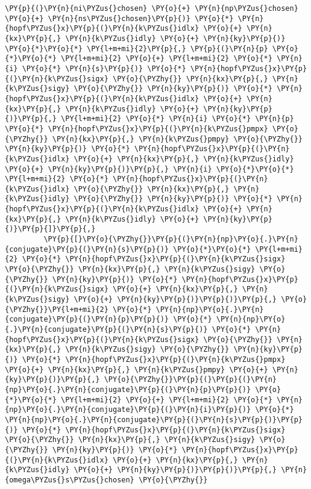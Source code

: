 \begin{Verbatim}[commandchars=\\\{\}]
          \PY{p}{(}\PY{n}{ni\PYZus{}chosen} \PY{o}{+} \PY{n}{np\PYZus{}chosen} \PY{o}{+} \PY{n}{ns\PYZus{}chosen}\PY{p}{)} \PY{o}{*} \PY{n}{hopf\PYZus{}x}\PY{p}{(}\PY{n}{k\PYZus{}idlx} \PY{o}{+} \PY{n}{kx}\PY{p}{,} \PY{n}{k\PYZus{}idly} \PY{o}{+} \PY{n}{ky}\PY{p}{)} \PY{o}{*}\PY{o}{*} \PY{l+m+mi}{2}\PY{p}{,} \PY{p}{(}\PY{n}{p} \PY{o}{*}\PY{o}{*} \PY{l+m+mi}{2} \PY{o}{+} \PY{l+m+mi}{2} \PY{o}{*} \PY{n}{i} \PY{o}{*} \PY{n}{s}\PY{p}{)} \PY{o}{*} \PY{n}{hopf\PYZus{}x}\PY{p}{(}\PY{n}{k\PYZus{}sigx} \PY{o}{\PYZhy{}} \PY{n}{kx}\PY{p}{,} \PY{n}{k\PYZus{}sigy} \PY{o}{\PYZhy{}} \PY{n}{ky}\PY{p}{)} \PY{o}{*} \PY{n}{hopf\PYZus{}x}\PY{p}{(}\PY{n}{k\PYZus{}idlx} \PY{o}{+} \PY{n}{kx}\PY{p}{,} \PY{n}{k\PYZus{}idly} \PY{o}{+} \PY{n}{ky}\PY{p}{)}\PY{p}{,} \PY{l+m+mi}{2} \PY{o}{*} \PY{n}{i} \PY{o}{*} \PY{n}{p} \PY{o}{*} \PY{n}{hopf\PYZus{}x}\PY{p}{(}\PY{n}{k\PYZus{}pmpx} \PY{o}{\PYZhy{}} \PY{n}{kx}\PY{p}{,} \PY{n}{k\PYZus{}pmpy} \PY{o}{\PYZhy{}} \PY{n}{ky}\PY{p}{)} \PY{o}{*} \PY{n}{hopf\PYZus{}x}\PY{p}{(}\PY{n}{k\PYZus{}idlx} \PY{o}{+} \PY{n}{kx}\PY{p}{,} \PY{n}{k\PYZus{}idly} \PY{o}{+} \PY{n}{ky}\PY{p}{)}\PY{p}{,} \PY{n}{i} \PY{o}{*}\PY{o}{*} \PY{l+m+mi}{2} \PY{o}{*} \PY{n}{hopf\PYZus{}x}\PY{p}{(}\PY{n}{k\PYZus{}idlx} \PY{o}{\PYZhy{}} \PY{n}{kx}\PY{p}{,} \PY{n}{k\PYZus{}idly} \PY{o}{\PYZhy{}} \PY{n}{ky}\PY{p}{)} \PY{o}{*} \PY{n}{hopf\PYZus{}x}\PY{p}{(}\PY{n}{k\PYZus{}idlx} \PY{o}{+} \PY{n}{kx}\PY{p}{,} \PY{n}{k\PYZus{}idly} \PY{o}{+} \PY{n}{ky}\PY{p}{)}\PY{p}{]}\PY{p}{,}
         \PY{p}{[}\PY{o}{\PYZhy{}}\PY{p}{(}\PY{n}{np}\PY{o}{.}\PY{n}{conjugate}\PY{p}{(}\PY{n}{s}\PY{p}{)} \PY{o}{*}\PY{o}{*} \PY{l+m+mi}{2} \PY{o}{*} \PY{n}{hopf\PYZus{}x}\PY{p}{(}\PY{n}{k\PYZus{}sigx} \PY{o}{\PYZhy{}} \PY{n}{kx}\PY{p}{,} \PY{n}{k\PYZus{}sigy} \PY{o}{\PYZhy{}} \PY{n}{ky}\PY{p}{)} \PY{o}{*} \PY{n}{hopf\PYZus{}x}\PY{p}{(}\PY{n}{k\PYZus{}sigx} \PY{o}{+} \PY{n}{kx}\PY{p}{,} \PY{n}{k\PYZus{}sigy} \PY{o}{+} \PY{n}{ky}\PY{p}{)}\PY{p}{)}\PY{p}{,} \PY{o}{\PYZhy{}}\PY{l+m+mi}{2} \PY{o}{*} \PY{n}{np}\PY{o}{.}\PY{n}{conjugate}\PY{p}{(}\PY{n}{p}\PY{p}{)} \PY{o}{*} \PY{n}{np}\PY{o}{.}\PY{n}{conjugate}\PY{p}{(}\PY{n}{s}\PY{p}{)} \PY{o}{*} \PY{n}{hopf\PYZus{}x}\PY{p}{(}\PY{n}{k\PYZus{}sigx} \PY{o}{\PYZhy{}} \PY{n}{kx}\PY{p}{,} \PY{n}{k\PYZus{}sigy} \PY{o}{\PYZhy{}} \PY{n}{ky}\PY{p}{)} \PY{o}{*} \PY{n}{hopf\PYZus{}x}\PY{p}{(}\PY{n}{k\PYZus{}pmpx} \PY{o}{+} \PY{n}{kx}\PY{p}{,} \PY{n}{k\PYZus{}pmpy} \PY{o}{+} \PY{n}{ky}\PY{p}{)}\PY{p}{,} \PY{o}{\PYZhy{}}\PY{p}{(}\PY{p}{(}\PY{n}{np}\PY{o}{.}\PY{n}{conjugate}\PY{p}{(}\PY{n}{p}\PY{p}{)} \PY{o}{*}\PY{o}{*} \PY{l+m+mi}{2} \PY{o}{+} \PY{l+m+mi}{2} \PY{o}{*} \PY{n}{np}\PY{o}{.}\PY{n}{conjugate}\PY{p}{(}\PY{n}{i}\PY{p}{)} \PY{o}{*} \PY{n}{np}\PY{o}{.}\PY{n}{conjugate}\PY{p}{(}\PY{n}{s}\PY{p}{)}\PY{p}{)} \PY{o}{*} \PY{n}{hopf\PYZus{}x}\PY{p}{(}\PY{n}{k\PYZus{}sigx} \PY{o}{\PYZhy{}} \PY{n}{kx}\PY{p}{,} \PY{n}{k\PYZus{}sigy} \PY{o}{\PYZhy{}} \PY{n}{ky}\PY{p}{)} \PY{o}{*} \PY{n}{hopf\PYZus{}x}\PY{p}{(}\PY{n}{k\PYZus{}idlx} \PY{o}{+} \PY{n}{kx}\PY{p}{,} \PY{n}{k\PYZus{}idly} \PY{o}{+} \PY{n}{ky}\PY{p}{)}\PY{p}{)}\PY{p}{,} \PY{n}{omega\PYZus{}s\PYZus{}chosen} \PY{o}{\PYZhy{}}

\end{Verbatim}

